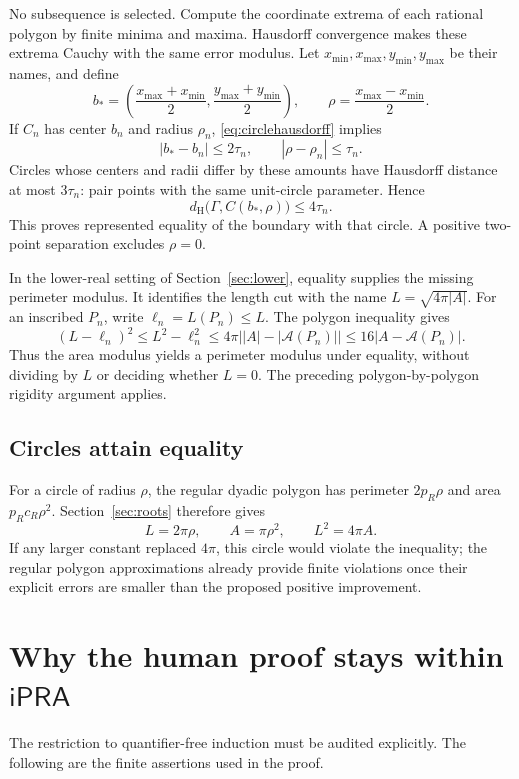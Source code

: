 \documentclass[11pt,a4paper]{article}
\theoremstyle{definition}
\newcommand{\ipra}{\mathsf{iPRA}}
\newcommand{\Area}{\mathcal A}
\newcommand{\dH}{d_{\mathrm H}}
\begin{document}
No subsequence is selected. Compute the coordinate extrema of each
rational polygon by finite minima and maxima. Hausdorff convergence
makes these extrema Cauchy with the same error modulus.
Let \(x_{\min},x_{\max},y_{\min},y_{\max}\) be their names, and define
\[
 b_*=\left(\frac{x_{\max}+x_{\min}}2,
            \frac{y_{\max}+y_{\min}}2\right),\qquad
 \rho=\frac{x_{\max}-x_{\min}}2.
 \tag{10.14}\label{eq:canonicalcircle}
\]
If \(C_n\) has center \(b_n\) and radius \(\rho_n\),
\eqref{eq:circlehausdorff} implies
\[
 |b_*-b_n|\le2\tau_n,\qquad |\rho-\rho_n|\le\tau_n.
\]
Circles whose centers and radii differ by these amounts have
Hausdorff distance at most \(3\tau_n\): pair points with the same
unit-circle parameter. Hence
\[
 \dH\bigl(\Gamma,C(b_*,\rho)\bigr)\le4\tau_n.
 \tag{10.15}\label{eq:finalrigidity}
\]
This proves represented equality of the boundary with that circle.
A positive two-point separation excludes \(\rho=0\).

In the lower-real setting of Section~\ref{sec:lower}, equality supplies
the missing perimeter modulus. It identifies the length cut with the
name \(L=\sqrt{4\pi|A|}\). For an inscribed \(P_n\), write
\(\ell_n=L(P_n)\le L\). The polygon inequality gives
\[
 (L-\ell_n)^2\le L^2-\ell_n^2
 \le4\pi\bigl||A|-|\Area(P_n)|\bigr|
 \le16|A-\Area(P_n)|.
 \tag{10.16}\label{eq:equalitylengthmod}
\]
Thus the area modulus yields a perimeter modulus under equality,
without dividing by \(L\) or deciding whether \(L=0\).
The preceding polygon-by-polygon rigidity argument applies.

\subsection{Circles attain equality}
For a circle of radius \(\rho\), the regular dyadic polygon has
perimeter \(2p_R\rho\) and area \(p_Rc_R\rho^2\).
Section~\ref{sec:roots} therefore gives
\[
 L=2\pi\rho,\qquad A=\pi\rho^2,\qquad L^2=4\pi A.
\]
If any larger constant replaced \(4\pi\), this circle would violate
the inequality; the regular polygon approximations already provide
finite violations once their explicit errors are smaller than the
proposed positive improvement.

\section{Why the human proof stays within \texorpdfstring{\(\ipra\)}{iPRA}}
\label{sec:audit}
The restriction to quantifier-free induction must be audited explicitly.
The following are the finite assertions used in the proof.
\end{document}
